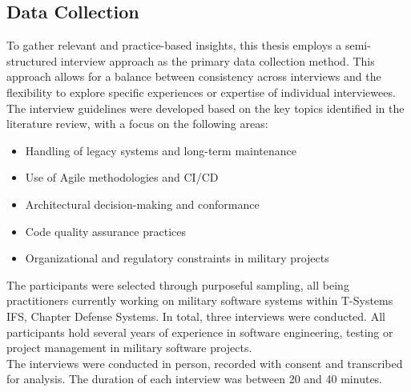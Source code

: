 \subsection{Data Collection}
To gather relevant and practice-based insights, this thesis employs a semi-structured interview approach as the primary data collection method. This approach allows for a balance between consistency across interviews and the flexibility to explore specific experiences or expertise of individual interviewees.
The interview guidelines were developed based on the key topics identified in the literature review, with a focus on the following areas:
\begin{itemize}
    \item Handling of legacy systems and long-term maintenance
    \item Use of Agile methodologies and \ac{CI/CD}
    \item Architectural decision-making and conformance
    \item Code quality assurance practices
    \item Organizational and regulatory constraints in military projects
\end{itemize}
The participants were selected through purposeful sampling, all being practitioners currently working on military software systems within T-Systems IFS, Chapter Defense Systems. In total, three interviews were conducted. All participants hold several years of experience in software engineering, testing or project management
in military software projects.\\
The interviews were conducted in person, recorded with consent and transcribed for analysis. The duration of each interview was between 20 and 40 minutes.
